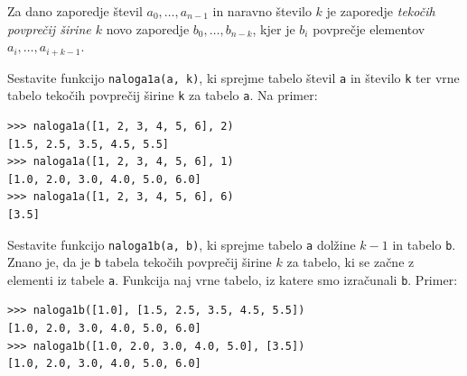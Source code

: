 \documentclass[arhiv]{izpit}
\begin{document}

\naloga[25 + 10 točk]

Za dano zaporedje števil $a_0, \ldots, a_{n-1}$ in naravno število $k$ je zaporedje
\emph{tekočih povprečij širine $k$} novo zaporedje $b_0, \ldots, b_{n-k}$, kjer je $b_i$
povprečje elementov $a_i, \ldots, a_{i+k-1}$.

\podnaloga[25 točk] Sestavite funkcijo
\texttt{naloga1a(a, k)}, ki sprejme tabelo števil \texttt{a} in število \texttt{k}
ter vrne tabelo tekočih povprečij širine \texttt{k} za tabelo \texttt{a}. Na primer:
%
\begin{verbatim}
>>> naloga1a([1, 2, 3, 4, 5, 6], 2)
[1.5, 2.5, 3.5, 4.5, 5.5]
>>> naloga1a([1, 2, 3, 4, 5, 6], 1)
[1.0, 2.0, 3.0, 4.0, 5.0, 6.0]
>>> naloga1a([1, 2, 3, 4, 5, 6], 6)
[3.5]
\end{verbatim}

\podnaloga[10 točk]
Sestavite funkcijo \texttt{naloga1b(a, b)}, ki sprejme tabelo \texttt{a} dolžine $k-1$ in
tabelo \texttt{b}. Znano je, da je \texttt{b} tabela tekočih povprečij širine $k$ za
tabelo, ki se začne z elementi iz tabele \texttt{a}. Funkcija naj vrne tabelo, iz katere
smo izračunali \texttt{b}. Primer:
%
\begin{verbatim}
>>> naloga1b([1.0], [1.5, 2.5, 3.5, 4.5, 5.5])
[1.0, 2.0, 3.0, 4.0, 5.0, 6.0]
>>> naloga1b([1.0, 2.0, 3.0, 4.0, 5.0], [3.5])
[1.0, 2.0, 3.0, 4.0, 5.0, 6.0]
\end{verbatim}



\naloga[20 + 20 točk]
\end{document}
